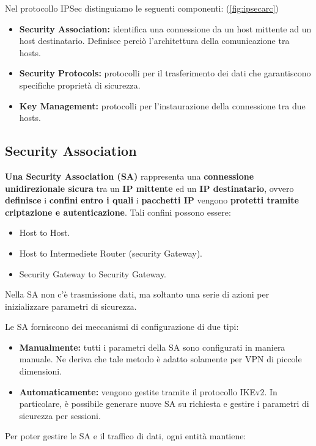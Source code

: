 \pagebreak
\begin{definition}\label{def:ipsecarc}
Nel protocollo IPSec distinguiamo le seguenti componenti: (\cref{fig:ipsecarc})
\begin{itemize}
    \item \textbf{Security Association:} identifica una connessione da un host mittente ad un host destinatario. Definisce perciò l'architettura della comunicazione tra hosts.
    \item \textbf{Security Protocols:} protocolli per il trasferimento dei dati che garantiscono specifiche proprietà di sicurezza.
    \item \textbf{Key Management:} protocolli per l’instaurazione della connessione tra due hosts.
\end{itemize}
\end{definition}
\subsection{Security Association}
\textbf{Una Security Association (SA)} rappresenta una \textbf{connessione unidirezionale sicura} tra un \textbf{IP mittente} ed un \textbf{IP destinatario}, ovvero \textbf{definisce} i \textbf{confini} \textbf{entro i quali} i \textbf{pacchetti IP} vengono \textbf{protetti tramite criptazione e autenticazione}. Tali confini possono essere:
\begin{itemize}
    \item Host to Host.
    \item Host to Intermediete Router (security Gateway).
    \item Security Gateway to Security Gateway.
\end{itemize}
\begin{note}
Nella SA non c'è trasmissione dati, ma soltanto una serie di azioni per inizializzare parametri di sicurezza.
\end{note}
\begin{proposition}[SA Setup]\label{prop:sasetup}
Le SA forniscono dei meccanismi di configurazione di due tipi:
\begin{itemize}
    \item \textbf{Manualmente:} tutti i parametri della SA sono configurati in maniera manuale. Ne deriva che tale metodo è adatto solamente per VPN di piccole dimensioni.
    \item \textbf{Automaticamente:} vengono gestite tramite il protocollo IKEv2. In particolare, è possibile generare nuove SA su richiesta e gestire i parametri di sicurezza per sessioni.
\end{itemize}
\end{proposition}
Per poter gestire le SA e il traffico di dati, ogni entità mantiene:

